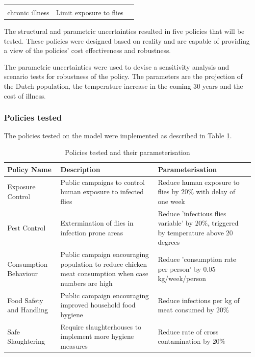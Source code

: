 \begin{longtable}[]{|l|l|l|}
                               & \begin{tabular}[c]{@{}l@{}}Proportion of people developing \\ chronic illness\end{tabular} & Limit exposure to flies                                                                                     \\ \hline
\end{longtable}

The structural and parametric uncertainties resulted in five policies that will be tested. These policies were designed based on reality and are capable of providing a view of the policies' cost effectiveness and robustness. 

The parametric uncertainties were used to devise a sensitivity analysis and scenario tests for robustness of the policy. The parameters are the projection of the Dutch population, the temperature increase in the coming 30 years and the cost of illness. 

\subsubsection{Policies tested}

The policies tested on the model were implemented as described in Table \ref{tab:policies}.

\begin{table}[h!]
\centering
\caption{Policies tested and their parameterisation}
\begin{tabular}{ l  p{3.8cm}  p{3.8cm}}
\hline
Policy Name &
   Description &
  Parameterisation \\ \hline
Exposure Control &
  Public campaigns to control human exposure to infected flies &
  Reduce human exposure to flies by 20\% with delay of one week \\
Pest Control &
  Extermination of flies in infection prone areas &
  Reduce 'infectious flies variable' by 20\%, triggered by temperature above 20 degrees \\
Consumption Behaviour &
  Public campaign encouraging population to reduce chicken meat consumption when case numbers are high &
  Reduce 'consumption rate per person' by 0.05 kg/week/person \\
Food Safety and Handling &
  Public campaign encouraging improved household food hygiene &
  Reduce infections per kg of meat consumed by 20\% \\
Safe Slaughtering &
  Require slaughterhouses to implement more hygiene measures &
  Reduce rate of cross contamination by 20\%
\end{tabular}
\label{tab:policies}
\end{table}


